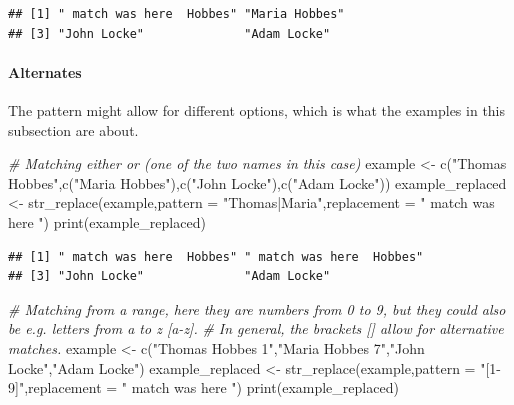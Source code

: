 \documentclass[
]{book}
\newenvironment{Shaded}{\begin{snugshade}}{\end{snugshade}}
\newcommand{\AttributeTok}[1]{\textcolor[rgb]{0.77,0.63,0.00}{#1}}
\newcommand{\CommentTok}[1]{\textcolor[rgb]{0.56,0.35,0.01}{\textit{#1}}}
\newcommand{\FunctionTok}[1]{\textcolor[rgb]{0.00,0.00,0.00}{#1}}
\newcommand{\NormalTok}[1]{#1}
\newcommand{\OtherTok}[1]{\textcolor[rgb]{0.56,0.35,0.01}{#1}}
\newcommand{\StringTok}[1]{\textcolor[rgb]{0.31,0.60,0.02}{#1}}
\begin{document}
\begin{verbatim}
## [1] " match was here  Hobbes" "Maria Hobbes"           
## [3] "John Locke"              "Adam Locke"
\end{verbatim}

\hypertarget{alternates}{%
\paragraph{Alternates}\label{alternates}}

The pattern might allow for different options, which is what the examples in this subsection are about.

\begin{Shaded}
\begin{Highlighting}[]
\CommentTok{\# Matching either or (one of the two names in this case)}
\NormalTok{example }\OtherTok{\textless{}{-}} \FunctionTok{c}\NormalTok{(}\StringTok{"Thomas Hobbes"}\NormalTok{,}\FunctionTok{c}\NormalTok{(}\StringTok{"Maria Hobbes"}\NormalTok{),}\FunctionTok{c}\NormalTok{(}\StringTok{"John Locke"}\NormalTok{),}\FunctionTok{c}\NormalTok{(}\StringTok{"Adam Locke"}\NormalTok{))}
\NormalTok{example\_replaced }\OtherTok{\textless{}{-}} \FunctionTok{str\_replace}\NormalTok{(example,}\AttributeTok{pattern =} \StringTok{"Thomas|Maria"}\NormalTok{,}\AttributeTok{replacement =} \StringTok{" match was here "}\NormalTok{)}
\FunctionTok{print}\NormalTok{(example\_replaced)}
\end{Highlighting}
\end{Shaded}

\begin{verbatim}
## [1] " match was here  Hobbes" " match was here  Hobbes"
## [3] "John Locke"              "Adam Locke"
\end{verbatim}

\begin{Shaded}
\begin{Highlighting}[]
\CommentTok{\# Matching from a range, here they are numbers from 0 to 9, but they could also be e.g. letters from a to z [a{-}z].}
\CommentTok{\# In general, the brackets [] allow for alternative matches.}
\NormalTok{example }\OtherTok{\textless{}{-}} \FunctionTok{c}\NormalTok{(}\StringTok{"Thomas Hobbes 1"}\NormalTok{,}\StringTok{"Maria Hobbes 7"}\NormalTok{,}\StringTok{"John Locke"}\NormalTok{,}\StringTok{"Adam Locke"}\NormalTok{)}
\NormalTok{example\_replaced }\OtherTok{\textless{}{-}} \FunctionTok{str\_replace}\NormalTok{(example,}\AttributeTok{pattern =} \StringTok{"[1{-}9]"}\NormalTok{,}\AttributeTok{replacement =} \StringTok{" match was here "}\NormalTok{)}
\FunctionTok{print}\NormalTok{(example\_replaced)}
\end{Highlighting}
\end{Shaded}
\end{document}
